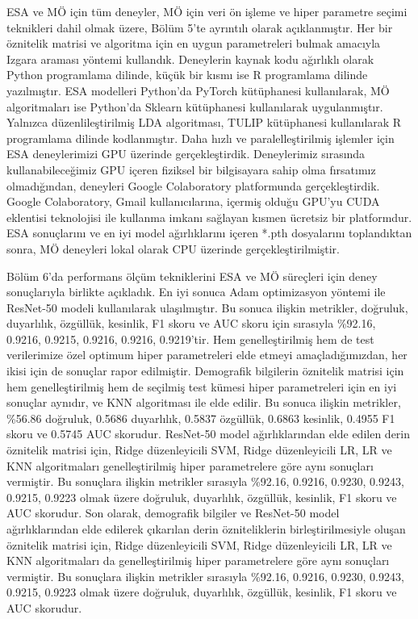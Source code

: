 ESA ve MÖ için tüm deneyler, MÖ için veri ön işleme ve hiper parametre seçimi teknikleri dahil olmak üzere, Bölüm 5'te ayrıntılı olarak açıklanmıştır. Her bir öznitelik matrisi ve algoritma için en uygun parametreleri bulmak amacıyla Izgara araması yöntemi kullandık. Deneylerin kaynak kodu ağırlıklı olarak Python programlama dilinde, küçük bir kısmı ise R programlama dilinde yazılmıştır. ESA modelleri Python'da PyTorch kütüphanesi kullanılarak, MÖ algoritmaları ise Python'da Sklearn kütüphanesi kullanılarak uygulanmıştır. Yalnızca düzenlileştirilmiş LDA algoritması, TULIP kütüphanesi kullanılarak R programlama dilinde kodlanmıştır. Daha hızlı ve paralelleştirilmiş işlemler için ESA deneylerimizi GPU üzerinde gerçekleştirdik. Deneylerimiz sırasında kullanabileceğimiz GPU içeren fiziksel bir bilgisayara sahip olma fırsatımız olmadığından, deneyleri Google Colaboratory platformunda gerçekleştirdik. Google Colaboratory, Gmail kullanıcılarına, içermiş olduğu GPU'yu CUDA eklentisi teknolojisi ile kullanma imkanı sağlayan kısmen ücretsiz bir platformdur. ESA sonuçlarını ve en iyi model ağırlıklarını içeren *.pth dosyalarını toplandıktan sonra, MÖ deneyleri lokal olarak CPU üzerinde gerçekleştirilmiştir.

Bölüm 6'da performans ölçüm tekniklerini ESA ve MÖ süreçleri için deney sonuçlarıyla birlikte açıkladık. En iyi sonuca Adam optimizasyon yöntemi ile ResNet-50 modeli kullanılarak ulaşılmıştır. Bu sonuca ilişkin metrikler, doğruluk, duyarlılık, özgüllük, kesinlik, F1 skoru ve AUC skoru için sırasıyla \%92.16, 0.9216, 0.9215, 0.9216, 0.9216, 0.9219'tir. Hem genelleştirilmiş hem de test verilerimize özel optimum hiper parametreleri elde etmeyi amaçladığımızdan, her ikisi için de sonuçlar rapor edilmiştir. Demografik bilgilerin öznitelik matrisi için hem genelleştirilmiş hem de seçilmiş test kümesi hiper parametreleri için en iyi sonuçlar aynıdır, ve KNN algoritması ile elde edilir. Bu sonuca ilişkin metrikler, \%56.86 doğruluk, 0.5686 duyarlılık, 0.5837 özgüllük, 0.6863 kesinlik, 0.4955 F1 skoru ve 0.5745 AUC skorudur. ResNet-50 model ağırlıklarından elde edilen derin öznitelik matrisi için, Ridge düzenleyicili SVM, Ridge düzenleyicili LR, LR ve KNN algoritmaları genelleştirilmiş hiper parametrelere göre aynı sonuçları vermiştir. Bu sonuçlara ilişkin metrikler sırasıyla \%92.16, 0.9216, 0.9230, 0.9243, 0.9215, 0.9223 olmak üzere doğruluk, duyarlılık, özgüllük, kesinlik, F1 skoru ve AUC skorudur. Son olarak, demografik bilgiler ve ResNet-50 model ağırlıklarından elde edilerek çıkarılan derin özniteliklerin birleştirilmesiyle oluşan öznitelik matrisi için, Ridge düzenleyicili SVM, Ridge düzenleyicili LR, LR ve KNN algoritmaları da genelleştirilmiş hiper parametrelere göre aynı sonuçları vermiştir. Bu sonuçlara ilişkin metrikler sırasıyla \%92.16, 0.9216, 0.9230, 0.9243, 0.9215, 0.9223 olmak üzere doğruluk, duyarlılık, özgüllük, kesinlik, F1 skoru ve AUC skorudur.


